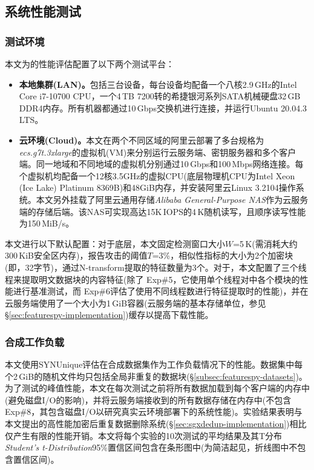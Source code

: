 \subsection{系统性能测试}
\label{subsec:featurespy-evaluation-performance}

\subsubsection{测试环境}
\label{subsubsec:featurespy-platform}

本文为\prototype 的性能评估配置了以下两个测试平台：

\begin{itemize}[leftmargin=*]
    \item {\bf 本地集群(LAN)。}包括三台设备，每台设备均配备一个八核2.9\,GHz的Intel Core i7-10700 CPU，一个4\,TB 7200转的希捷银河系列SATA机械硬盘32\,GB DDR4内存。所有机器都通过10\,Gbps交换机进行连接，并运行Ubuntu 20.04.3 LTS。
    \item {\bf 云环境(Cloud)。}本文在两个不同区域的阿里云\cite{Alibaba}部署了多台规格为\textit{ecs.g7t.3xlarge}的虚拟机(VM)来分别运行云服务端、密钥服务器和多个客户端。同一地域和不同地域的虚拟机分别通过10\,Gbps和100\,Mbps网络连接。每个虚拟机均配备一个12核3.5GHz的虚拟CPU(底层物理机CPU为Intel Xeon (Ice Lake) Platinum 8369B)和48GiB内存，并安装阿里云Linux 3.2104操作系统。本文另外挂载了阿里云通用存储\textit{Alibaba General-Purpose NAS}作为云服务端的存储后端。该NAS可实现高达15K\,IOPS的4\,K随机读写，且顺序读写性能为150\,MiB/s。
\end{itemize}

本文进行以下默认配置：对于底层\sysnameF，本文固定检测窗口大小$W$=5\,K(需消耗大约300\,KiB安全区内存)，报告攻击的阈值$T$=3\%，相似性指标的大小为2个加密块(即，32字节)，通过N-transform提取的特征数量为3个。对于\prototype，本文配置了三个线程来提取明文数据块的内容特征(除了 Exp\#5，它使用单个线程对\prototype 中各个模块的性能进行基准测试，而 Exp\#6评估了\prototype 使用不同线程数进行特征提取时的性能)，并在云服务端使用了一个大小为1\,GiB容器(云服务端的基本存储单位，参见\S\ref{sec:featurespy-implementation})缓存以提高下载性能。

\subsubsection{合成工作负载}
\label{subsubsec:featurespy-syn}
本文使用SYNUnique评估\prototype 在合成数据集作为工作负载情况下的性能。数据集中每个2\,GiB的随机文件均只包括全局非重复的数据块(\S\ref{subsec:featurespy-datasets})。为了测试\prototype 的峰值性能，本文在每次测试之前将所有数据加载到每个客户端的内存中(避免磁盘I/O的影响)，并将云服务端接收到的所有数据存储在内存中(不包含Exp\#8，其包含磁盘I/O以研究真实云环境部署下的系统性能)。实验结果表明\prototype 与本文提出的高性能加密后重复数据删除系统\sysnameS (\S\ref{sec:sgxdedup-implementation})相比仅产生有限的性能开销。本文将每个实验的10次测试的平均结果及其T分布\textit{Student's t-Distribution}95\%置信区间包含在条形图中(为简洁起见，折线图中不包含置信区间)。

